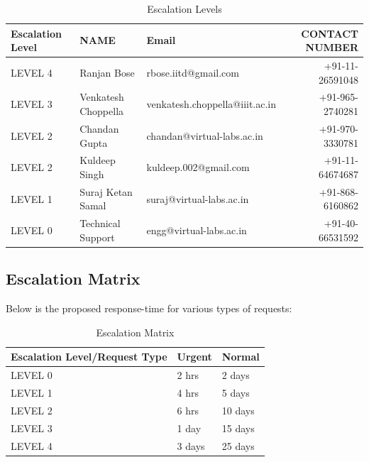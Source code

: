 \documentclass[11pt]{article}
\begin{document}
\begin{table}[H]
\caption{\label{tbl: Escalation Levels}Escalation Levels}
\begin{center}
\begin{tabular}{lllr}
\hline
 Escalation Level  &  NAME                 &  Email                           &   CONTACT NUMBER  \\
\hline
 LEVEL 4           &  Ranjan Bose          &  rbose.iitd@gmail.com            &  +91-11-26591048  \\
 LEVEL 3           &  Venkatesh Choppella  &  venkatesh.choppella@iiit.ac.in  &  +91-965-2740281  \\
\hline
 LEVEL 2           &  Chandan Gupta        &  chandan@virtual-labs.ac.in      &  +91-970-3330781  \\
 LEVEL 2           &  Kuldeep Singh        &  kuldeep.002@gmail.com           &  +91-11-64674687  \\
 LEVEL 1           &  Suraj Ketan Samal    &  suraj@virtual-labs.ac.in        &  +91-868-6160862  \\
 LEVEL 0           &  Technical Support    &  engg@virtual-labs.ac.in         &  +91-40-66531592  \\
\hline
\end{tabular}
\end{center}
\end{table}


\subsection{Escalation Matrix}
\label{sec-5.3}


 Below is the proposed response-time for various types of requests:


\begin{table}[H]
\caption{\label{tbl: Escalation Matrix}Escalation Matrix}
\begin{center}
\begin{tabular}{lll}
\hline
 Escalation Level/Request Type  &  Urgent  &  Normal   \\
\hline
 LEVEL 0                        &  2 hrs   &  2 days   \\
 LEVEL 1                        &  4 hrs   &  5 days   \\
 LEVEL 2                        &  6 hrs   &  10 days  \\
 LEVEL 3                        &  1 day   &  15 days  \\
 LEVEL 4                        &  3 days  &  25 days  \\
\hline
\end{tabular}
\end{center}
\end{table}
\end{document}
